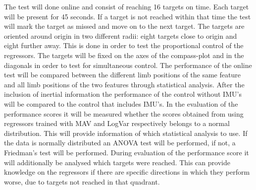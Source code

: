 The test will done online and consist of reaching 16 targets on time. Each target will be present for 45 seconds. If a target is not reached within that time the test will mark the target as missed and move on to the next target. The targets are oriented around origin in two different radii: eight targets close to origin and eight further away. This is done in order to test the proportional control of the regressors. The targets will be fixed on the axes of the compass-plot and in the diagonals in order to test for simultaneous control.
The performance of the online test will be compared between the different limb positions of the same feature and all limb positions of the two features through statistical analysis. After the inclusion of inertial information the performance of the control without IMU's will be compared to the control that includes IMU's. 
In the evaluation of the performance scores it will be measured whether the scores obtained from using regressors trained with MAV and LogVar respectively belongs to a normal distribution. This will provide information of which statistical analysis to use. If the data is normally distributed an ANOVA test will be performed, if not, a Friedman's test will be performed. During evaluation of the performance score it will additionally be analysed which targets were reached. This can provide knowledge on the regressors if there are specific directions in which they perform worse, due to targets not reached in that quadrant.  


%
%
%
